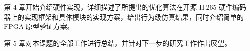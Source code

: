 第 4 章开始介绍硬件实现，详细描述了所提出的优化算法在开源 H.265 硬件编码器上的实现框架和具体模块的实现方案，给出行为级仿真结果，同时介绍简单的 FPGA 原型验证方案。

第 5 章对本课题的全部工作进行总结，并针对下一步的研究工作作出展望。




